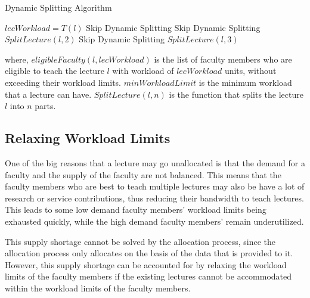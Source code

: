 \begin{algorithm}[H]
  \caption{Dynamic Splitting Algorithm}
  \begin{algorithmic}[1]
    \State $lecWorkload = T(l)$
    \State Skip Dynamic Splitting
    \State Skip Dynamic Splitting
    \State $SplitLecture(l, 2)$
    \State Skip Dynamic Splitting
    \State $SplitLecture(l, 3)$
    \EndIf
    \EndFor
    \EndProcedure
  \end{algorithmic}
  \label{alg:dynamic_splitting}
\end{algorithm}

where, $eligibleFaculty(l, lecWorkload)$ is the list of faculty members who are eligible to teach the lecture $l$ with workload of $lecWorkload$ units, without exceeding their workload limits. $minWorkloadLimit$ is the minimum workload that a lecture can have. $SplitLecture(l, n)$ is the function that splits the lecture $l$ into $n$ parts.

\subsection{Relaxing Workload Limits}
\label{sec:workload_limit_relaxation}

One of the big reasons that a lecture may go unallocated is that the demand for a faculty and the supply of the faculty are not balanced. This means that the faculty members who are best to teach multiple lectures may also be have a lot of research or service contributions, thus reducing their bandwidth to teach lectures. This leads to some low  demand faculty members' workload limits being exhausted quickly, while the high demand faculty members' remain underutilized.

This supply shortage cannot be solved by the allocation process, since the allocation process only allocates on the basis of the data that is provided to it. However, this supply shortage can be accounted for by relaxing the workload limits of the faculty members if the existing lectures cannot be accommodated within the workload limits of the faculty members.

